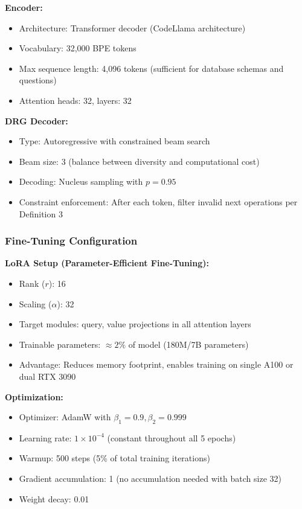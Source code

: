 \documentclass[conference]{IEEEtran}
\begin{document}
\textbf{Encoder:}
\begin{itemize}
\item Architecture: Transformer decoder (CodeLlama architecture)
\item Vocabulary: 32,000 BPE tokens
\item Max sequence length: 4,096 tokens (sufficient for database schemas and questions)
\item Attention heads: 32, layers: 32
\end{itemize}

\textbf{DRG Decoder:}
\begin{itemize}
\item Type: Autoregressive with constrained beam search
\item Beam size: 3 (balance between diversity and computational cost)
\item Decoding: Nucleus sampling with $p=0.95$
\item Constraint enforcement: After each token, filter invalid next operations per Definition 3
\end{itemize}

\subsubsection{Fine-Tuning Configuration}

\textbf{LoRA Setup (Parameter-Efficient Fine-Tuning):}
\begin{itemize}
\item Rank ($r$): 16
\item Scaling ($\alpha$): 32
\item Target modules: query, value projections in all attention layers
\item Trainable parameters: $\approx 2\%$ of model (180M/7B parameters)
\item Advantage: Reduces memory footprint, enables training on single A100 or dual RTX 3090
\end{itemize}

\textbf{Optimization:}
\begin{itemize}
\item Optimizer: AdamW with $\beta_1=0.9, \beta_2=0.999$
\item Learning rate: $1 \times 10^{-4}$ (constant throughout all 5 epochs)
\item Warmup: 500 steps (5\% of total training iterations)
\item Gradient accumulation: 1 (no accumulation needed with batch size 32)
\item Weight decay: 0.01
\end{itemize}
\end{document}
